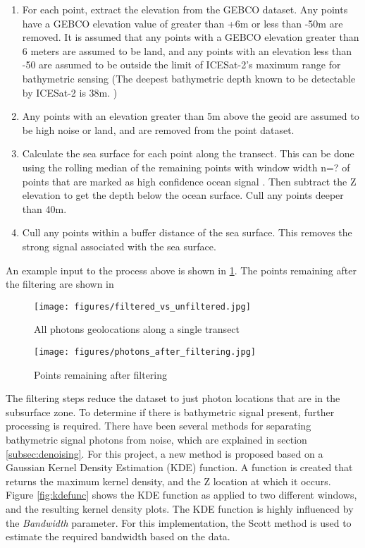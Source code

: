 \begin{enumerate}
    \item For each point, extract the elevation from the GEBCO dataset. Any points have a GEBCO elevation value of greater than +6m or less than -50m are removed. It is assumed that any points with a GEBCO elevation greater than 6 meters are assumed to be land, and any points with an elevation less than -50 are assumed to be outside the limit of ICESat-2's maximum range for bathymetric sensing (The deepest bathymetric depth known to be detectable by ICESat-2 is 38m. \parencite{Parrish2019})
    
    \item Any points with an elevation greater than 5m above the geoid are assumed to be high noise or land, and are removed from the point dataset.

    \item Calculate the sea surface for each point along the transect. This can be done using the rolling median of the remaining points with window width n=? of points that are marked as high confidence ocean signal \parencite{Ranndal2021}. Then subtract the Z elevation to get the depth below the ocean surface.  Cull any points deeper than 40m. 
    \item Cull any points within a buffer distance of the sea surface. This removes the strong signal associated with the sea surface.
\end{enumerate}

An example input to the process above is shown in \ref{fig:filtering_results}. The points remaining after the filtering are shown in 

\begin{figure}[h!]
    \centering
    \texttt{[image: figures/filtered\_vs\_unfiltered.jpg]}
    \caption{All photons geolocations along a single transect}
    \label{fig:filtering_results}
\end{figure}

\begin{figure}[h!]
    \centering
    \texttt{[image: figures/photons\_after\_filtering.jpg]}
    \caption{Points remaining after filtering}
    \label{fig:filtered_pts_only}
\end{figure}

The filtering steps reduce the dataset to just photon locations that are in the subsurface zone. To determine if there is bathymetric signal present, further processing is required. There have been several methods for separating bathymetric signal photons from noise, which are explained in section \ref{subsec:denoising}. For this project, a new method is proposed based on a Gaussian Kernel Density Estimation (KDE) function. A function is created that returns the maximum kernel density, and the Z location at which it occurs. Figure \ref{fig:kdefunc} shows the KDE function as applied to two different windows, and the resulting kernel density plots. The KDE function is highly influenced by the \emph{Bandwidth} parameter. For this implementation, the Scott method \parencite{Scott2015} is used to estimate the required bandwidth based on the data. 

